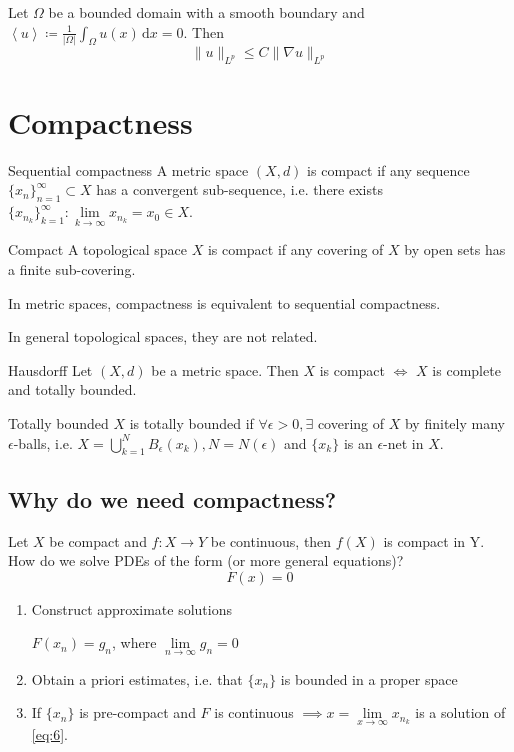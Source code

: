 \documentclass{report}
\begin{document}
{
    Let \(\Omega\) be a bounded domain with a smooth boundary and \(\left\langle u \right\rangle \coloneqq \frac{1}{\vert \Omega \vert } \int_{\Omega} u(x) \,\mathrm{d}x = 0\). Then 
    \[
        \|u\|_{L^{p}} \leq C \|\nabla u\|_{L^{p}}
    \]   
}

\section{Compactness}
\begin{definition}{Sequential compactness}{}
    A metric space \((X, d)\) is compact if any sequence \(\{x_{n}\}_{n=1}^{\infty} \subset X\) has a convergent sub-sequence, i.e. there exists \(\{x_{n_{k}}\}_{k=1}^{\infty} \colon \lim\limits_{k \to \infty} x_{n_{k}} = x_0 \in X\).
\end{definition}

\begin{definition}{Compact}{}
    A topological space \(X\) is compact if any covering of \(X\) by open sets has a finite sub-covering.
\end{definition}

\begin{note}
    In metric spaces, compactness is equivalent to sequential compactness.

    In general topological spaces, they are not related.
\end{note}

\begin{theorem}{Hausdorff}{}
    Let \((X, d)\) be a metric space. Then \(X\) is compact \(\iff\) \(X\) is complete and totally bounded.
\end{theorem}

\begin{definition}{Totally bounded}{}
    \(X\) is totally bounded if \(\forall \epsilon > 0, \exists\) covering of \(X\) by finitely many \(\epsilon\)-balls, i.e. \(X = \bigcup_{k=1}^{N} B_{\epsilon}(x_k), N = N(\epsilon)\) and \(\{x_k\}\) is an \(\epsilon\)-net in \(X\).
\end{definition}

\subsection*{Why do we need compactness?}
Let \(X\) be compact and \(f \colon X \to Y \) be continuous, then \(f(X)\) is compact in Y. How do we solve PDEs of the form (or more general equations)?
\begin{equation}\label{eq:6}
    F(x) = 0
\end{equation}
\begin{enumerate}
    \item Construct approximate solutions
    
    \(F(x_n) = g_n\), where \(\lim\limits_{n \to \infty} g_n = 0\)
    \item Obtain a priori estimates, i.e. that \(\{x_n\}\) is bounded in a proper space
    \item If \(\{x_n\}\) is pre-compact and \(F\) is continuous \(\implies x = \lim\limits_{x \to \infty} x_{n_{k}}\) is a solution of \ref{eq:6}.
\end{enumerate}
\end{document}
